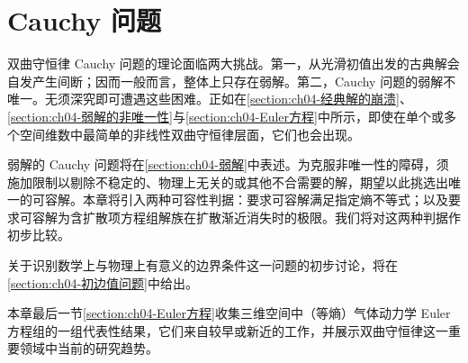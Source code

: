 \documentclass[../main.tex]{subfiles}
\begin{document}
\chapter{Cauchy 问题}\label{chapter:ch04-cauchy问题}

双曲守恒律 Cauchy 问题的理论面临两大挑战。第一，从光滑初值出发的古典解会自发产生间断；因而一般而言，整体上只存在弱解。第二，Cauchy 问题的弱解不唯一。无须深究即可遭遇这些困难。正如在\cref{section:ch04-经典解的崩溃}、\cref{section:ch04-弱解的非唯一性}与\cref{section:ch04-Euler方程}中所示，即使在单个或多个空间维数中最简单的非线性双曲守恒律层面，它们也会出现。

弱解的 Cauchy 问题将在\cref{section:ch04-弱解}中表述。为克服非唯一性的障碍，须施加限制以剔除不稳定的、物理上无关的或其他不合需要的解，期望以此挑选出唯一的可容解。本章将引入两种可容性判据：要求可容解满足指定熵不等式；以及要求可容解为含扩散项方程组解族在扩散渐近消失时的极限。我们将对这两种判据作初步比较。

关于识别数学上与物理上有意义的边界条件这一问题的初步讨论，将在\cref{section:ch04-初边值问题}中给出。

本章最后一节\cref{section:ch04-Euler方程}收集三维空间中（等熵）气体动力学 Euler 方程组的一组代表性结果，它们来自较早或新近的工作，并展示双曲守恒律这一重要领域中当前的研究趋势。










\end{document}
